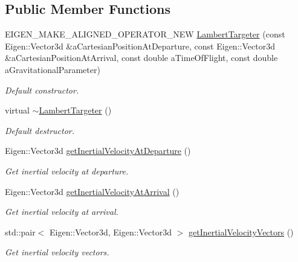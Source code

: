 \subsection*{Public Member Functions}
\begin{DoxyCompactItemize}
\item 
E\+I\+G\+E\+N\+\_\+\+M\+A\+K\+E\+\_\+\+A\+L\+I\+G\+N\+E\+D\+\_\+\+O\+P\+E\+R\+A\+T\+O\+R\+\_\+\+N\+EW \hyperlink{classtudat_1_1mission__segments_1_1LambertTargeter_a332842cdf2c2302ed2ade4c50b170ad9}{Lambert\+Targeter} (const Eigen\+::\+Vector3d \&a\+Cartesian\+Position\+At\+Departure, const Eigen\+::\+Vector3d \&a\+Cartesian\+Position\+At\+Arrival, const double a\+Time\+Of\+Flight, const double a\+Gravitational\+Parameter)
\begin{DoxyCompactList}\small\item\em Default constructor. \end{DoxyCompactList}\item 
virtual \hyperlink{classtudat_1_1mission__segments_1_1LambertTargeter_ab70e44ba68bb104a0d86e293e00b0ea2}{$\sim$\+Lambert\+Targeter} ()
\begin{DoxyCompactList}\small\item\em Default destructor. \end{DoxyCompactList}\item 
Eigen\+::\+Vector3d \hyperlink{classtudat_1_1mission__segments_1_1LambertTargeter_aaa55de14f573813df2ca90540ef51148}{get\+Inertial\+Velocity\+At\+Departure} ()
\begin{DoxyCompactList}\small\item\em Get inertial velocity at departure. \end{DoxyCompactList}\item 
Eigen\+::\+Vector3d \hyperlink{classtudat_1_1mission__segments_1_1LambertTargeter_a9f04eb41af7d6ab2c3ae2597b65155fd}{get\+Inertial\+Velocity\+At\+Arrival} ()
\begin{DoxyCompactList}\small\item\em Get inertial velocity at arrival. \end{DoxyCompactList}\item 
std\+::pair$<$ Eigen\+::\+Vector3d, Eigen\+::\+Vector3d $>$ \hyperlink{classtudat_1_1mission__segments_1_1LambertTargeter_ae3a2c762748e3e4ed914b9b248003bf6}{get\+Inertial\+Velocity\+Vectors} ()
\begin{DoxyCompactList}\small\item\em Get inertial velocity vectors. \end{DoxyCompactList}\end{DoxyCompactItemize}
